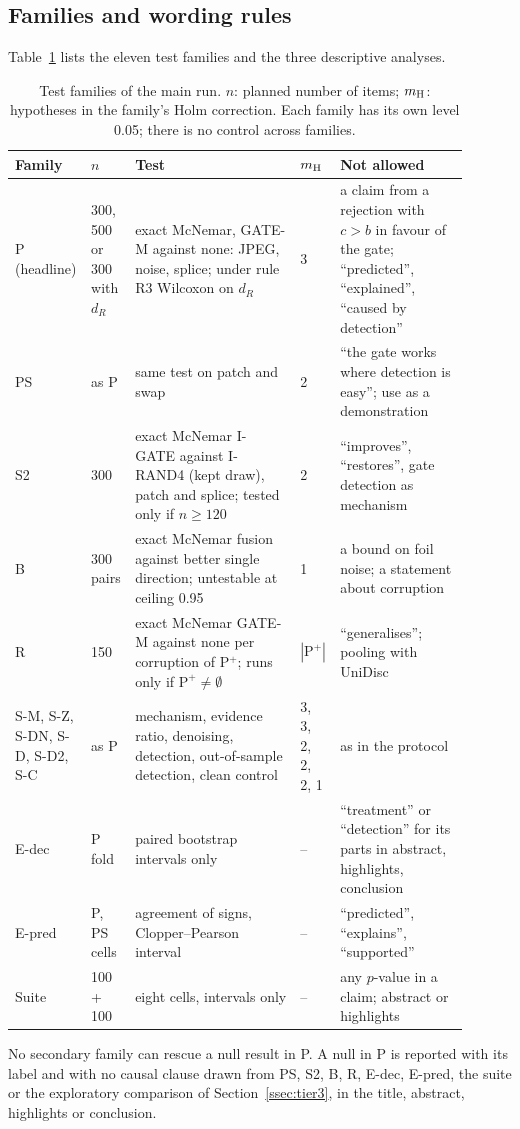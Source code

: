 \subsection{Families and wording rules}\label{app:families}
Table~\ref{tab:families} lists the eleven test families and the three descriptive analyses.
\begin{table}[t]
\centering
\caption{Test families of the main run. $n$: planned number of items; $m_{\rm H}$: hypotheses in the family's Holm correction.
Each family has its own level 0.05; there is no control across families.}
\label{tab:families}
\footnotesize
\setlength{\tabcolsep}{3pt}
\begin{tabular}{p{0.12\linewidth}p{0.09\linewidth}p{0.36\linewidth}p{0.05\linewidth}p{0.28\linewidth}}
\toprule
Family & $n$ & Test & $m_{\rm H}$ & Not allowed \\
\midrule
P (headline) & 300, 500 or 300 with $d_R$ & exact McNemar, GATE-M against none: JPEG, noise, splice; under rule R3 Wilcoxon on $d_R$ & 3 & a claim from a rejection with $c>b$ in favour of the gate; ``predicted'', ``explained'', ``caused by detection'' \\
PS & as P & same test on patch and swap & 2 & ``the gate works where detection is easy''; use as a demonstration \\
S2 & 300 & exact McNemar I-GATE against I-RAND4 (kept draw), patch and splice; tested only if $n\ge120$ & 2 & ``improves'', ``restores'', gate detection as mechanism \\
B & 300 pairs & exact McNemar fusion against better single direction; untestable at ceiling 0.95 & 1 & a bound on foil noise; a statement about corruption \\
R & 150 & exact McNemar GATE-M against none per corruption of P$^+$; runs only if $\text{P}^+\neq\emptyset$ & $|\text{P}^+|$ & ``generalises''; pooling with UniDisc \\
S-M, S-Z, S-DN, S-D, S-D2, S-C & as P & mechanism, evidence ratio, denoising, detection, out-of-sample detection, clean control & 3, 3, 2, 2, 2, 1 & as in the protocol \\
\midrule
E-dec & P fold & paired bootstrap intervals only & -- & ``treatment'' or ``detection'' for its parts in abstract, highlights, conclusion \\
E-pred & P, PS cells & agreement of signs, Clopper--Pearson interval & -- & ``predicted'', ``explains'', ``supported'' \\
Suite & 100 + 100 & eight cells, intervals only & -- & any $p$-value in a claim; abstract or highlights \\
\bottomrule
\end{tabular}
\end{table}
No secondary family can rescue a null result in P.
A null in P is reported with its label and with no causal clause drawn from PS, S2, B, R, E-dec, E-pred, the suite or the
exploratory comparison of Section~\ref{ssec:tier3}, in the title, abstract, highlights or conclusion.

